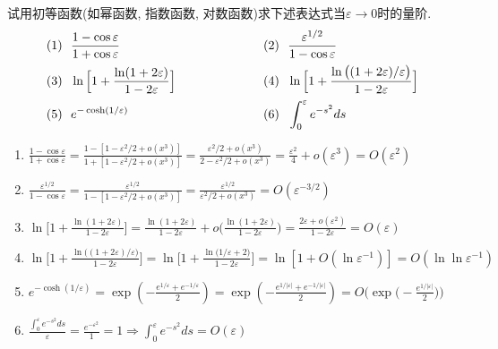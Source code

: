 \begin{problem}[习题1.1]
试用初等函数(如幂函数, 指数函数, 对数函数)求下述表达式当$\varepsilon\rightarrow 0$时的量阶.
\[
\begin{array}{lll}
    \displaystyle (1)~~\frac{1-\cos\varepsilon}{1+\cos\varepsilon} &\hspace{5em}&   \displaystyle (2)~~\frac{\varepsilon^{1/2}}{1-\cos\varepsilon} \\
    \noalign{\vskip5pt}
    \displaystyle  (3)~~\ln\Big[1+\frac{\ln(1+2\varepsilon)}{1-2\varepsilon}\Big] &\hspace{5em}&  \displaystyle (4)~~ \ln\Big[1+\frac{\ln\big((1+2\varepsilon)/\varepsilon\big)}{1-2\varepsilon}\Big]\\
    \noalign{\vskip5pt}
    \displaystyle (5)~~e^{-\cosh(1/\varepsilon)} &\hspace{5em}&  \displaystyle (6)~~\int_0^\varepsilon e^{-s^2} ds
\end{array}
\]
\end{problem}

\begin{solution}

\begin{enumerate}
\item $\displaystyle \frac{1-\cos\varepsilon}{1+\cos\varepsilon}
= \frac{1-[1-\varepsilon^2/2+o(x^3)]}{1+[1-\varepsilon^2/2+o(x^3)]}
=\frac{\varepsilon^2/2+o(x^3)}{2-\varepsilon^2/2+o(x^3)}
= \frac{\varepsilon^2}{4}+o(\varepsilon^3) = O(\varepsilon^2)
$

\item $\displaystyle \frac{\varepsilon^{1/2}}{1-\cos\varepsilon}
= \frac{\varepsilon^{1/2}}{1-[1-\varepsilon^2/2+o(x^3)]}
=\frac{\varepsilon^{1/2}}{\varepsilon^2/2+o(x^3)}
=O(\varepsilon^{-3/2})
$

\item $
\displaystyle\ln\Big[1+\frac{\ln(1+2\varepsilon)}{1-2\varepsilon}\Big]
= \frac{\ln(1+2\varepsilon)}{1-2\varepsilon} + o\Big(\frac{\ln(1+2\varepsilon)}{1-2\varepsilon}\Big)
=\frac{2\varepsilon + o(\varepsilon^2)}{1-2\varepsilon} = O(\varepsilon)
$

\item $\displaystyle
\ln\Big[1+\frac{\ln\big((1+2\varepsilon)/\varepsilon\big)}{1-2\varepsilon}\Big]
=\ln\Big[1+\frac{\ln\big(1/\varepsilon+2\big)}{1-2\varepsilon}\Big]
=\ln[1+O(\ln\varepsilon^{-1})] = O(\ln\ln\varepsilon^{-1})
$

\item $\displaystyle
e^{-\cosh(1/\varepsilon)}
=\exp(-\frac{e^{1/\varepsilon}+e^{-1/\varepsilon}}{2})
= \exp(-\frac{e^{1/|\varepsilon|}+e^{-1/|\varepsilon|}}{2})
= O\Big(\exp\big(-\frac{e^{1/|\varepsilon|}}{2}\big)\Big)
$

\item $\displaystyle
\frac{\int_0^\varepsilon e^{-s^2} ds}{\varepsilon} = \frac{e^{-\varepsilon^2}}{1} = 1
\Longrightarrow \int_0^\varepsilon e^{-s^2} ds = O(\varepsilon)
$
\end{enumerate}
\end{solution} 
